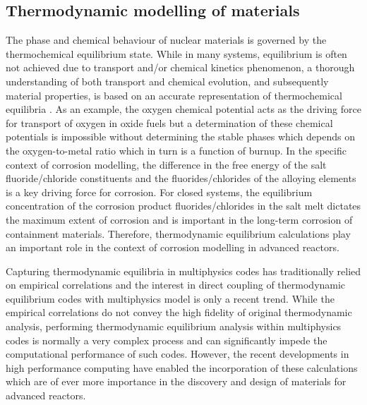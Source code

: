 	\subsection{Thermodynamic modelling of materials}
	The phase and chemical behaviour of nuclear materials is governed by the thermochemical equilibrium state. While in many systems, equilibrium is often not achieved due to transport and/or chemical kinetics phenomenon, a thorough understanding of both transport and chemical evolution, and subsequently material properties, is  based on an accurate representation of thermochemical equilibria \cite{Devanathan:2010aa}. As an example, the oxygen chemical potential acts as the driving force for transport of oxygen in oxide fuels but a determination of these chemical potentials is impossible without determining the stable phases which depends on the oxygen-to-metal ratio which in turn is a function of burnup.  In the specific context of corrosion modelling, the difference in the free energy of the salt fluoride/chloride constituents and the fluorides/chlorides of the alloying elements is a key driving force for corrosion. For closed systems, the equilibrium concentration of the corrosion product fluorides/chlorides in the salt melt dictates the maximum extent of corrosion and is important in the long-term corrosion of containment materials. Therefore, thermodynamic equilibrium calculations play an important role in the context of corrosion modelling in advanced reactors.

	Capturing thermodynamic equilibria in multiphysics codes has traditionally relied on empirical correlations and the interest in direct coupling of thermodynamic equilibrium codes with multiphysics model is only a recent trend. While the empirical correlations do not convey the high fidelity of original thermodynamic analysis, performing thermodynamic equilibrium analysis within multiphysics codes is normally a very complex process and can significantly impede the computational performance of such codes. However, the recent developments in high performance computing have enabled the incorporation of these calculations which are of ever more importance in the discovery and design of materials for advanced reactors.

